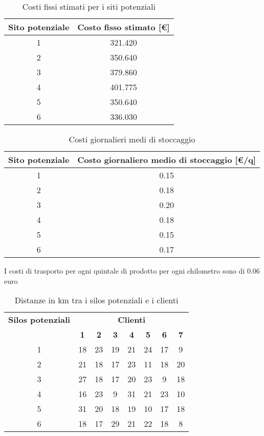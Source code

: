 \begin{table}[htbp]
    \centering
    \caption{Costi fissi stimati per i siti potenziali}
    \begin{tabular}{|c|c|}
        \hline
        \textbf{Sito potenziale} & \textbf{Costo fisso stimato [€]} \\
        \hline
        1 & 321.420 \\
        2 & 350.640 \\
        3 & 379.860 \\
        4 & 401.775 \\
        5 & 350.640 \\
        6 & 336.030 \\
        \hline
    \end{tabular}
\end{table}

\begin{table}[htbp]
    \centering
    \caption{Costi giornalieri medi di stoccaggio}
    \begin{tabular}{|c|c|}
        \hline
        \textbf{Sito potenziale} & \textbf{Costo giornaliero medio di stoccaggio [€/q]} \\
        \hline
        1 & 0.15 \\
        2 & 0.18 \\
        3 & 0.20 \\
        4 & 0.18 \\
        5 & 0.15 \\
        6 & 0.17 \\
        \hline
    \end{tabular}
\end{table}

I costi di trasporto per ogni quintale di prodotto per ogni chilometro 
sono di 0.06 euro

\begin{table}[htbp]
    \centering
    \caption{Distanze in km tra i silos potenziali e i clienti}
    \begin{tabular}{|c|c|c|c|c|c|c|c|}
        \hline
        \textbf{Silos potenziali} & \multicolumn{7}{c|}{\textbf{Clienti}} \\
        \cline{2-8}
        & \textbf{1} & \textbf{2} & \textbf{3} & \textbf{4} & \textbf{5} & \textbf{6} & \textbf{7} \\
        \hline
        1 & 18 & 23 & 19 & 21 & 24 & 17 & 9 \\
        2 & 21 & 18 & 17 & 23 & 11 & 18 & 20 \\
        3 & 27 & 18 & 17 & 20 & 23 & 9 & 18 \\
        4 & 16 & 23 & 9 & 31 & 21 & 23 & 10 \\
        5 & 31 & 20 & 18 & 19 & 10 & 17 & 18 \\
        6 & 18 & 17 & 29 & 21 & 22 & 18 & 8 \\
        \hline
    \end{tabular}
\end{table}

